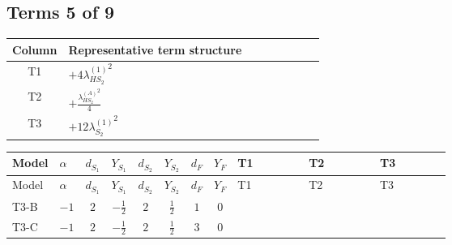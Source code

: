 \documentclass[8pt]{article}
\begin{document}
\begin{landscape}
\subsection*{Terms 5 of 9}
\begin{center}
\begin{tabular}{@{}c >{\raggedright\arraybackslash}p{0.82\linewidth}@{}}
\toprule
Column & Representative term structure \\
\midrule
T1 & \(\displaystyle +4 {\lambda_{HS_2}^{(1)}}^2\) \\
\midrule
T2 & \(\displaystyle +\frac{{\lambda_{HS_2}^{(A)}}^2}{4}\) \\
\midrule
T3 & \(\displaystyle +12 {\lambda_{S_2}^{(1)}}^2\) \\
\midrule
\bottomrule
\end{tabular}
\end{center}
\smallskip
\tiny
\begin{longtable}{@{}llcccccc >{\raggedright\arraybackslash}p{0.21\linewidth} >{\raggedright\arraybackslash}p{0.21\linewidth} >{\raggedright\arraybackslash}p{0.21\linewidth}@{}}
\toprule
Model & $\alpha$ & $d_{S_1}$ & $Y_{S_1}$ & $d_{S_2}$ & $Y_{S_2}$ & $d_F$ & $Y_F$ & T1 & T2 & T3 \\
\midrule
\endfirsthead
\toprule
Model & $\alpha$ & $d_{S_1}$ & $Y_{S_1}$ & $d_{S_2}$ & $Y_{S_2}$ & $d_F$ & $Y_F$ & T1 & T2 & T3 \\
\midrule
\endhead
T3-B & $-1$ & $2$ & $-\frac{1}{2}$ & $2$ & $\frac{1}{2}$ & $1$ & $0$ & \scriptsize\adjustbox{max width=\linewidth}{$\begin{gathered} +4 {\lambda_{HS_2}^{(1)}}^2\end{gathered}$} & \scriptsize\adjustbox{max width=\linewidth}{$\begin{gathered} +\frac{{\lambda_{HS_2}^{(A)}}^2}{4}\end{gathered}$} & \scriptsize\adjustbox{max width=\linewidth}{$\begin{gathered} +12 {\lambda_{S_2}^{(1)}}^2\end{gathered}$} \\
\midrule
T3-C & $-1$ & $2$ & $-\frac{1}{2}$ & $2$ & $\frac{1}{2}$ & $3$ & $0$ & \scriptsize\adjustbox{max width=\linewidth}{$\begin{gathered} +4 {\lambda_{HS_2}^{(1)}}^2\end{gathered}$} & \scriptsize\adjustbox{max width=\linewidth}{$\begin{gathered} +\frac{{\lambda_{HS_2}^{(A)}}^2}{4}\end{gathered}$} & \scriptsize\adjustbox{max width=\linewidth}{$\begin{gathered} +12 {\lambda_{S_2}^{(1)}}^2\end{gathered}$} \\

\end{longtable}
\end{landscape}
\end{document}
